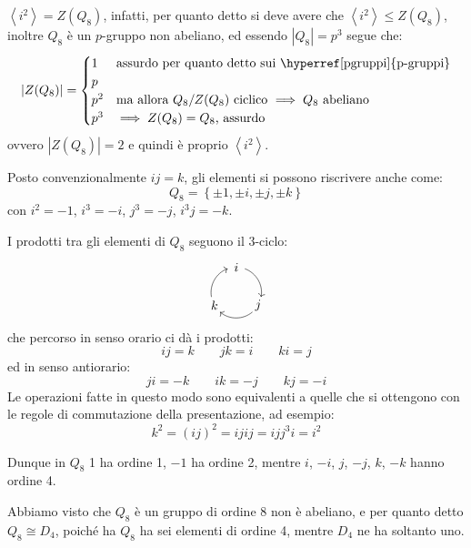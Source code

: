 \documentclass[11pt]{scrartcl}
\begin{document}
\begin{remark}
    $\left<i^2\right> = Z(Q_8)$, infatti, per quanto detto si deve avere che $\left<i^2\right> \leqslant  Z(Q_8)$, inoltre $Q_8$ è un $p$-gruppo non abeliano, ed
    essendo $|Q_8| = p^3$ segue che:
        \[ |Z(Q_8)| = \begin{cases}
                        1 & \text{assurdo per quanto detto sui \hyperref[pgruppi]{p-gruppi}} \\
                        p \\
                        p^2 & \text{ma allora $Q_8/Z(Q_8)$ ciclico $\implies Q_8$ abeliano} \\
                        p^3 & \text{$\implies Z(Q_8) = Q_8$, assurdo}
                    \end{cases}
        \]
      ovvero $|Z(Q_8)|=2$ e quindi è proprio $\left<i^2\right>$.
\end{remark}

Posto convenzionalmente $ij = k$, gli elementi si possono riscrivere anche come:
    \[ Q_8 = \left\{\pm 1, \pm i, \pm j, \pm k\right\}
        \]
con $i^2 = -1$, $i^3 = -i$, $j^3 = -j$, $i^3j = -k$.

\begin{remark}
    [Prodotto in $Q_8$]
    I prodotti tra gli elementi di $Q_8$ seguono il $3$-ciclo:
    \[  \begin{tikzpicture}[->,scale=.7] 
        \foreach \a/\t in {90/i,-30/j,210/k}{
          \node (\t) at (\a:1cm) {$\t$};
          \draw (\a-20:1cm)  arc (\a-20:\a-100:1cm);
        } 
        \end{tikzpicture}
    \]
    che percorso in senso orario ci dà i prodotti:
    \[ ij = k \qquad jk = i \qquad ki = j
        \]
    ed in senso antiorario:
    \[ ji = -k \qquad ik = -j \qquad kj = -i
        \]
    Le operazioni fatte in questo modo sono equivalenti a quelle che si ottengono con le regole di commutazione della presentazione, ad esempio:
        \[ k^2 = (ij)^2 = ijij = ijj^3i = i^2 
            \]
\end{remark}

\begin{remark}
    Dunque in $Q_8$ 1 ha ordine 1, $-1$ ha ordine 2, mentre $i$, $-i$, $j$, $-j$, $k$, $-k$ hanno ordine 4.   
\end{remark}

Abbiamo visto che $Q_8$ è un gruppo di ordine $8$ non è abeliano, e per quanto detto $Q_8 \cong D_4$,
poiché ha $Q_8$ ha sei elementi di ordine 4, mentre $D_4$ ne ha soltanto uno. \\
\end{document}
